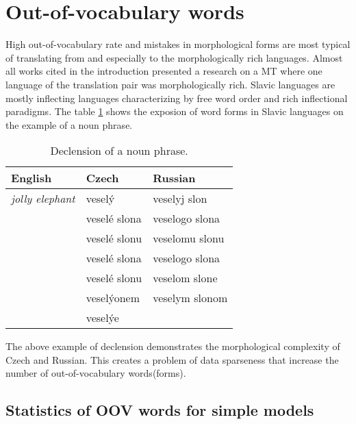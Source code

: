 \documentclass[11pt,letterpaper]{article}
\begin{document}

\section{Out-of-vocabulary words} 
High out-of-vocabulary rate and mistakes in morphological forms
are most typical of translating from and especially to 
the morphologically rich languages. Almost all works cited in the introduction 
presented a research on a MT where one language of the translation pair was morphologically rich.
Slavic languages are mostly inflecting languages characterizing by free word order and rich
inflectional paradigms. %
The table \ref{tab:slon} shows the exposion of word forms in Slavic languages on
the example of a noun phrase.

\begin{table}
\begin{center}
\begin{tabular}{|l|l|l|}
\hline
English & Czech & Russian \\ \hline
\textit{jolly elephant} & veselý & veselyj slon \\
 & veselé slona & veselogo slona \\
 & veselé slonu & veselomu slonu \\
 & veselé slona & veselogo slona \\ 
 & veselé slonu & veselom slone\\
 & veselýonem& veselym slonom\\
 & veselýe &\\
\hline
\end{tabular}
\end{center}
\caption{Declension of a noun phrase.}
\label{tab:slon}
\end{table}

The above example of declension demonstrates the morphological complexity of Czech and Russian.
This creates a problem of data sparseness that increase the number of out-of-vocabulary words(forms).

\subsection{Statistics of OOV words for simple models} 
\end{document}
